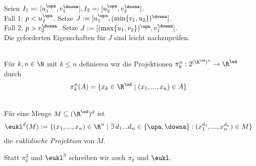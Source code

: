 \begin{bew}
    Seien $I_1 =: [u_1^\upa, v_1^\downa], I_2 =: [u_2^\upa, v_2^\downa]$.\\
    Fall 1: $p < u_2^\upa$. Setze $J := [u_1^\upa , (\min\{v_1,u_2\})^\downa]$.\\
    Fall 2: $p > v_2^\downa$. Setze $J := [(\max\{u_1,v_2\})^\upa, v_1^\downa]$.\\
    Die geforderten Eigenschaften für $J$ sind leicht nachzuprüfen.
\end{bew}

\begin{dfn}[Projektionen]\ \\
    Für $k,n \in \N$ mit $k \leq n$ definieren wir die Projektionen $\pi_k^n : 2^{(\R^\ud)^n} \to \R^\ud$ durch
    \begin{align*}
        \pi_k^n (A) = \{x_k \in \R^\ud \mid (x_1, ..., x_n) \in A\}
    \end{align*}
\end{dfn}

\begin{dfn}\ \\
    Für eine Menge $M \subseteq (\R^\ud)^d$ ist
    \begin{align*}
        \eukl^d(M) := \{(x_1,...,x_n) \in \R^n \mid \exists\, d_1 ... d_n \in \{\upa, \downa\}: (x_1^{d_1}, ..., x_n^{d_n}) \in M\}
    \end{align*}
    die \emph{euklidische Projektion} von $M$.
\end{dfn}

\begin{nota}
    Statt $\pi_k^3$ und $\eukl^3$ schreiben wir auch $\pi_k$ und $\eukl$.
\end{nota}




